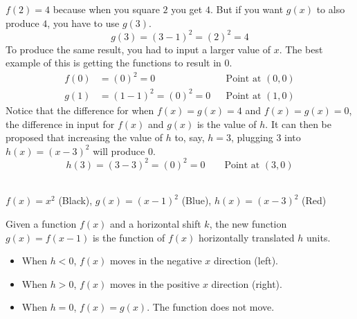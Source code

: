 $f(2) = 4$ because when you square $2$ you get $4$. But if you want $g(x)$ to also produce $4$, you have to use $g(3)$.
\[
    g(3) = (3 - 1)^2 = (2)^2 = 4
\]
To produce the same result, you had to input a larger value of $x$. The best example of this is getting the functions to result in $0$.
\begin{align*}
    f(0) &= (0)^2 = 0 && \text{Point at }(0, 0)\\
    g(1) &= (1 - 1)^2 = (0)^2 = 0 && \text{Point at }(1, 0)
\end{align*}
Notice that the difference for when $f(x) = g(x) = 4$ and $f(x) = g(x) = 0$, the difference in input for $f(x)$ and $g(x)$ is the value of $h$. It can then be proposed that increasing the value of $h$ to, say, $h = 3$, plugging $3$ into $h(x) = (x - 3)^2$ will produce $0$.
\[
    h(3) = (3 - 3)^2 = (0)^2 = 0 \qquad \text{Point at }(3, 0)
\]
\begin{center}
    \\
    $f(x) = x^2$ (Black), $g(x) = (x - 1)^2$ (Blue), $h(x) = (x - 3)^2$ (Red)
\end{center}
\begin{definition}
    Given a function $f(x)$ and a horizontal shift $k$, the new function $g(x) = f(x - 1)$ is the function of $f(x)$ horizontally translated $h$ units.
    \begin{itemize}
        \item When $h < 0$, $f(x)$ moves in the negative $x$ direction (left).
        \item When $h > 0$, $f(x)$ moves in the positive $x$ direction (right).
        \item When $h = 0$, $f(x) = g(x)$. The function does not move.
    \end{itemize}
\end{definition}